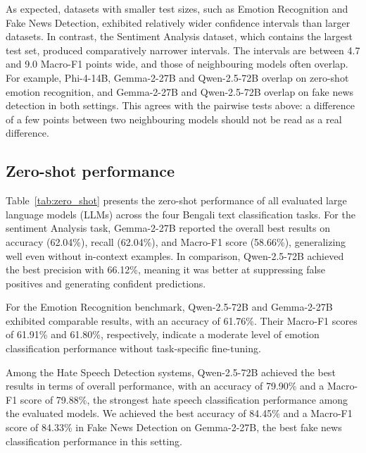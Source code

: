 \documentclass[10pt,letterpaper]{article}
\begin{document}
As expected, datasets with smaller test sizes, such as Emotion Recognition and Fake News Detection, exhibited relatively wider confidence intervals than larger datasets. In contrast, the Sentiment Analysis dataset, which contains the largest test set, produced comparatively narrower intervals. The intervals are between 4.7 and 9.0 Macro-F1 points wide, and those of neighbouring models often overlap. For example, Phi-4-14B, Gemma-2-27B and Qwen-2.5-72B overlap on zero-shot emotion recognition, and Gemma-2-27B and Qwen-2.5-72B overlap on fake news detection in both settings. This agrees with the pairwise tests above: a difference of a few points between two neighbouring models should not be read as a real difference.



\subsection*{Zero-shot performance}
\label{sec:zero_shot}

Table~\ref{tab:zero_shot} presents the zero-shot performance of all evaluated large language models (LLMs) across the four Bengali text classification tasks. For the sentiment Analysis task, Gemma-2-27B reported the overall best results on accuracy (62.04\%), recall (62.04\%), and Macro-F1 score (58.66\%), generalizing well even without in-context examples. In comparison, Qwen-2.5-72B achieved the best precision with 66.12\%, meaning it was better at suppressing false positives and generating confident predictions.

For the Emotion Recognition benchmark, Qwen-2.5-72B and Gemma-2-27B exhibited comparable results, with an accuracy of 61.76\%. Their Macro-F1 scores of 61.91\% and 61.80\%, respectively, indicate a moderate level of emotion classification performance without task-specific fine-tuning.


Among the Hate Speech Detection systems, Qwen-2.5-72B achieved the best results in terms of overall performance, with an accuracy of 79.90\% and a Macro-F1 score of 79.88\%, the strongest hate speech classification performance among the evaluated models. We achieved the best accuracy of 84.45\% and a Macro-F1 score of 84.33\% in Fake News Detection on Gemma-2-27B, the best fake news classification performance in this setting.
\end{document}
